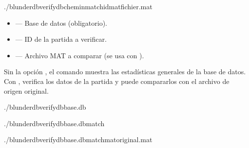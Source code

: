 \documentclass[letterpaper,10pt,spanish]{sphinxmanual}
\begin{document}
\begin{sphinxVerbatim}[commandchars=\\\{\}]
./blunderdbverify\PYGZhy{}\PYGZhy{}db\PYGZlt{}chemin\PYGZgt{}\PYG{o}{[}\PYGZhy{}\PYGZhy{}match\PYGZlt{}id\PYGZgt{}\PYG{o}{]}\PYG{o}{[}\PYGZhy{}\PYGZhy{}mat\PYGZlt{}fichier.mat\PYGZgt{}\PYG{o}{]}
\end{sphinxVerbatim}

\sphinxAtStartPar
{}
\begin{itemize}
\item {} 
\sphinxAtStartPar
{} — Base de datos (obligatorio).

\item {} 
\sphinxAtStartPar
{} — ID de la partida a verificar.

\item {} 
\sphinxAtStartPar
{} — Archivo MAT a comparar (se usa con ).

\end{itemize}

\sphinxAtStartPar
Sin la opción , el comando muestra las estadísticas generales de la base de datos. Con , verifica los datos de la partida y puede compararlos con el archivo de origen original.

\sphinxAtStartPar
{}

\begin{sphinxVerbatim}[commandchars=\\\{\}]
./blunderdbverify\PYGZhy{}\PYGZhy{}dbbase.db

./blunderdbverify\PYGZhy{}\PYGZhy{}dbbase.db\PYGZhy{}\PYGZhy{}match

./blunderdbverify\PYGZhy{}\PYGZhy{}dbbase.db\PYGZhy{}\PYGZhy{}match\PYGZhy{}\PYGZhy{}matoriginal.mat
\end{sphinxVerbatim}
\end{document}
